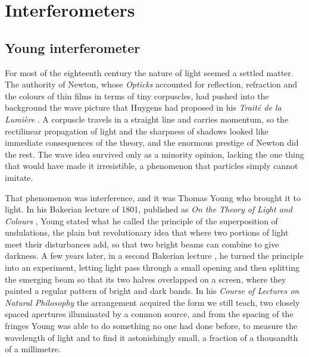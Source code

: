\section{Interferometers}

    \subsection{Young interferometer}

        For most of the eighteenth century the nature of light seemed a settled matter. The authority of Newton, whose \textit{Opticks} \cite{newton1704opticks} accounted for reflection, refraction and the colours of thin films in terms of tiny corpuscles, had pushed into the background the wave picture that Huygens had proposed in his \textit{Trait\'e de la Lumi\`ere} \cite{huygens1690traite}. A corpuscle travels in a straight line and carries momentum, so the rectilinear propagation of light and the sharpness of shadows looked like immediate consequences of the theory, and the enormous prestige of Newton did the rest. The wave idea survived only as a minority opinion, lacking the one thing that would have made it irresistible, a phenomenon that particles simply cannot imitate.

        That phenomenon was interference, and it was Thomas Young who brought it to light. In his Bakerian lecture of 1801, published as \textit{On the Theory of Light and Colours} \cite{young1802theory}, Young stated what he called the principle of the superposition of undulations, the plain but revolutionary idea that where two portions of light meet their disturbances add, so that two bright beams can combine to give darkness. A few years later, in a second Bakerian lecture \cite{young1804bakerian}, he turned the principle into an experiment, letting light pass through a small opening and then splitting the emerging beam so that its two halves overlapped on a screen, where they painted a regular pattern of bright and dark bands. In his \textit{Course of Lectures on Natural Philosophy} \cite{young1807course} the arrangement acquired the form we still teach, two closely spaced apertures illuminated by a common source, and from the spacing of the fringes Young was able to do something no one had done before, to measure the wavelength of light and to find it astonishingly small, a fraction of a thousandth of a millimetre.

